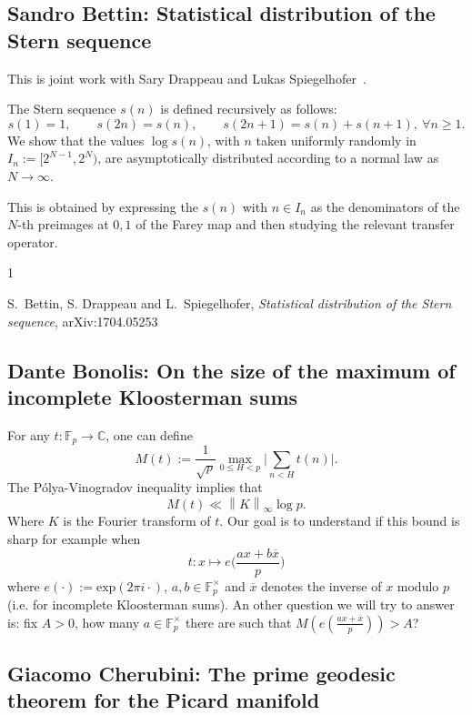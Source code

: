 \documentclass[15pt]{article}
\begin{document}
\subsection*{Sandro Bettin: Statistical distribution of the Stern sequence}
This is joint work with Sary Drappeau and Lukas Spiegelhofer~\cite{BSD}.
\vspace{0.3em}

The Stern sequence $s(n)$ is defined recursively as follows: 
$$
s(1)=1, \qquad s(2n)=s(n),\qquad s(2n+1)=s(n)+s(n+1),\ \forall n\geq1.
$$
We show that the values $\log s(n)$, with $n$ taken uniformly randomly in $I_n:=[2^{N-1},2^N)$, are asymptotically distributed according to a normal law as $N\to \infty$.

This is obtained by expressing the $s(n)$ with $n\in I_n$ as the denominators of the $N$-th preimages at ${0,1}$ of the Farey map and then studying the relevant transfer operator.


{\small
\begin{thebibliography}{1}

S.~Bettin, S. Drappeau and L.~Spiegelhofer, \emph{Statistical distribution of the Stern sequence}, arXiv:1704.05253
\end{thebibliography}
}

\subsection*{Dante Bonolis: On the size of the maximum of incomplete Kloosterman sums}
For any $t:\mathbb{F}_{p}\rightarrow\mathbb{C}$, one can define
\[
M(t):=\frac{1}{\sqrt{p}}\max_{0\leq H<p}\Bigg|\sum_{n<H}t(n)\Bigg|.
\]
The P\'olya-Vinogradov inequality implies that
\[
M(t)\ll \left\|K\right\|_{\infty}\log p.
\]
Where $K$ is the Fourier transform of $t$. Our goal is to understand if this bound is sharp for example when
\[
t:x\mapsto e\Big(\frac{ax+b\overline{x}}{p}\Big)
\]
where $e(\cdot):=\text{exp}(2\pi i\cdot)$, $a,b\in\mathbb{F}_{p}^{\times}$ and $\overline x$ denotes the inverse of $x$ modulo $p$ (i.e. for incomplete Kloosterman sums). An other question we will try to answer is: fix $A>0$, how many $a\in\mathbb{F}_{p}^{\times}$  there are such that $M(e(\tfrac{ax+\overline{x}}{p}))>A$?


\subsection*{Giacomo Cherubini: The prime geodesic theorem for the Picard manifold}
\end{document}
